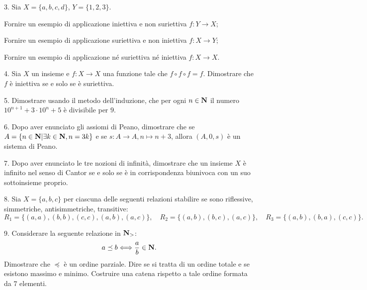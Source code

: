 \item{3.} Sia $X=\{a,b,c,d\}$, $Y=\{1,2,3\}$.

 Fornire un esempio di applicazione iniettiva e non suriettiva $f:Y\rightarrow X$;

 Fornire un esempio di applicazione suriettiva e non iniettiva $f:X\rightarrow Y$;

 Fornire un esempio di applicazione n\'e suriettiva n\'e iniettiva $f:X\rightarrow X$.
\vv

\item{4.} Sia $X$ un insieme e $f:X\rightarrow X$ una funzione tale che $f\circ f\circ f=f$. Dimostrare che $f$ \`{e} iniettiva
se e solo se \`{e} suriettiva. \vv

\item{5.} Dimostrare usando il metodo dell'induzione,
 che per ogni $n\in{\bf N}$ il numero $10^{n+1}+3\cdot 10^{n}+5$ \`{e} divisibile per $9$.
\ve\vs

\item{6.} Dopo aver enunciato gli assiomi di Peano, dimostrare che se
$A=\{n\in{\bf N} | \exists k\in{\bf N}, n=3k\}$ e se $s:A\rightarrow A, n\mapsto n+3$, allora $(A,0,s)$  \`e un sistema di Peano.
\vv

\item{7.} Dopo aver enunciato le tre nozioni di infinit\`a, dimostrare che un insieme $X$ \`e infinito nel senso di Cantor se e solo se \`e in corrispondenza
biunivoca con un suo sottoinsieme proprio.
\ve \vs

\item{8.} Sia $X=\{a,b,c\}$ per ciascuna delle seguenti relazioni stabilire se sono riflessive, simmetriche, antisimmetriche, transitive:
$$R_1=\{(a,a),(b,b),(c,c),(a,b),(a,c)\},\quad R_2=\{(a,b),(b,c),(a,c)\},\quad R_3=\{(a,b),(b,a),(c,c)\}.$$
\vv\vv

\item{9.} Considerare la seguente relazione in ${\bf N_>}$:
$$a\preceq b \Longleftrightarrow {a\over b}\in{\bf N}.$$
Dimostrare che $\preceq$ \`{e} un ordine parziale. Dire se si tratta di un ordine totale e se esistono massimo e minimo. 
Costruire una catena rispetto a tale ordine formata da $7$ elementi.
\ \vst

 \bye
